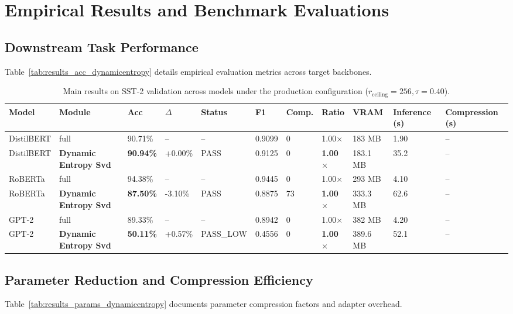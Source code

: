 \section{Empirical Results and Benchmark Evaluations}

\subsection{Downstream Task Performance}
Table~\ref{tab:results_acc_dynamicentropy} details empirical evaluation metrics across target backbones.

\begin{table}[t]
\centering
\small
\begin{tabular}{lllllllllll}
\toprule
\textbf{Model} & \textbf{Module} & \textbf{Acc} & \textbf{$\Delta$} & \textbf{Status} & \textbf{F1} & \textbf{Comp.} & \textbf{Ratio} & \textbf{VRAM} & \textbf{Inference (s)} & \textbf{Compression (s)} \\
\midrule
DistilBERT & full & 90.71\% & -- & -- & 0.9099 & 0 & 1.00$\times$ & 183 MB & 1.90 & -- \\
DistilBERT & \textbf{Dynamic Entropy Svd} & \textbf{90.94\%} & +0.00\% & PASS & 0.9125 & 0 & \textbf{1.00$\times$} & 183.1 MB & 35.2 & -- \\
RoBERTa & full & 94.38\% & -- & -- & 0.9445 & 0 & 1.00$\times$ & 293 MB & 4.10 & -- \\
RoBERTa & \textbf{Dynamic Entropy Svd} & \textbf{87.50\%} & -3.10\% & PASS & 0.8875 & 73 & \textbf{1.00$\times$} & 333.3 MB & 62.6 & -- \\
GPT-2 & full & 89.33\% & -- & -- & 0.8942 & 0 & 1.00$\times$ & 382 MB & 4.20 & -- \\
GPT-2 & \textbf{Dynamic Entropy Svd} & \textbf{50.11\%} & +0.57\% & PASS_LOW & 0.4556 & 0 & \textbf{1.00$\times$} & 389.6 MB & 52.1 & -- \\
\bottomrule
\end{tabular}
\caption{Main results on SST-2 validation across models under the production configuration ($r_{\mathrm{ceiling}}=256, \tau=0.40$).}
\label{tab:main_sst2}
\end{table}

\subsection{Parameter Reduction and Compression Efficiency}
Table~\ref{tab:results_params_dynamicentropy} documents parameter compression factors and adapter overhead.

